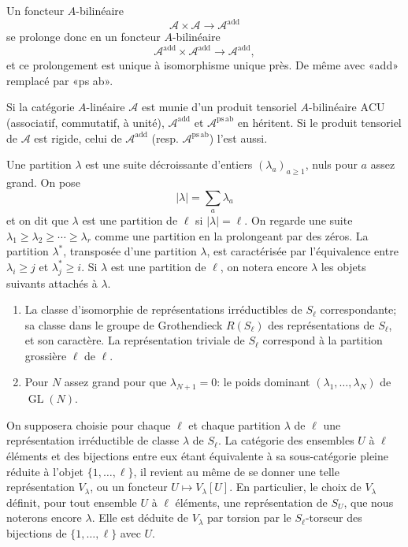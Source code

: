 \documentclass[11pt]{article}
\newcommand{\GL}{\operatorname{GL}}
\newcommand{\ACU}{\mathrm{ACU}}
\newcommand{\psab}{\mathrm{ps\,ab}}
\newcommand{\add}{\mathrm{add}}
\theoremstyle{deligne}
\newcommand{\para}[1]{\vspace{0.65em}\noindent{\bfseries #1}\quad}
\begin{document}
Un foncteur \(A\)-bilinéaire
\[
  \mathcal A\times\mathcal A\longrightarrow \mathcal A^{\add}
\]
se prolonge donc en un foncteur \(A\)-bilinéaire
\[
  \mathcal A^{\add}\times\mathcal A^{\add}\longrightarrow \mathcal A^{\add},
\]
et ce prolongement est unique à isomorphisme unique près. De même avec «add» remplacé par «ps ab».

Si la catégorie \(A\)-linéaire \(\mathcal A\) est munie d'un produit tensoriel \(A\)-bilinéaire \(\ACU\) (associatif, commutatif, à unité), \(\mathcal A^{\add}\) et \(\mathcal A^{\psab}\) en héritent. Si le produit tensoriel de \(\mathcal A\) est rigide, celui de \(\mathcal A^{\add}\) (resp. \(\mathcal A^{\psab}\)) l'est aussi.

\para{1.10.}
Une partition \(\lambda\) est une suite décroissante d'entiers \((\lambda_a)_{a\ge1}\), nuls pour \(a\) assez grand. On pose
\[
  |\lambda|=\sum_a \lambda_a
\]
et on dit que \(\lambda\) est une partition de \(\ell\) si \(|\lambda|=\ell\). On regarde une suite \(\lambda_1\ge\lambda_2\ge\cdots\ge\lambda_r\) comme une partition en la prolongeant par des zéros. La partition \(\lambda^*\), transposée d'une partition \(\lambda\), est caractérisée par l'équivalence entre \(\lambda_i\ge j\) et \(\lambda^*_j\ge i\). Si \(\lambda\) est une partition de \(\ell\), on notera encore \(\lambda\) les objets suivants attachés à \(\lambda\).

\begin{enumerate}[label=(\Alph*)]
\item La classe d'isomorphie de représentations irréductibles de \(S_\ell\) correspondante; sa classe dans le groupe de Grothendieck \(R(S_\ell)\) des représentations de \(S_\ell\), et son caractère. La représentation triviale de \(S_\ell\) correspond à la partition grossière \(\ell\) de \(\ell\).
\item Pour \(N\) assez grand pour que \(\lambda_{N+1}=0\): le poids dominant \((\lambda_1,\ldots,\lambda_N)\) de \(\GL(N)\).
\end{enumerate}

On supposera choisie pour chaque \(\ell\) et chaque partition \(\lambda\) de \(\ell\) une représentation irréductible de classe \(\lambda\) de \(S_\ell\). La catégorie des ensembles \(U\) à \(\ell\) éléments et des bijections entre eux étant équivalente à sa sous-catégorie pleine réduite à l'objet \(\{1,\ldots,\ell\}\), il revient au même de se donner une telle représentation \(V_\lambda\), ou un foncteur \(U\mapsto V_\lambda[U]\). En particulier, le choix de \(V_\lambda\) définit, pour tout ensemble \(U\) à \(\ell\) éléments, une représentation de \(S_U\), que nous noterons encore \(\lambda\). Elle est déduite de \(V_\lambda\) par torsion par le \(S_\ell\)-torseur des bijections de \(\{1,\ldots,\ell\}\) avec \(U\).
\end{document}
